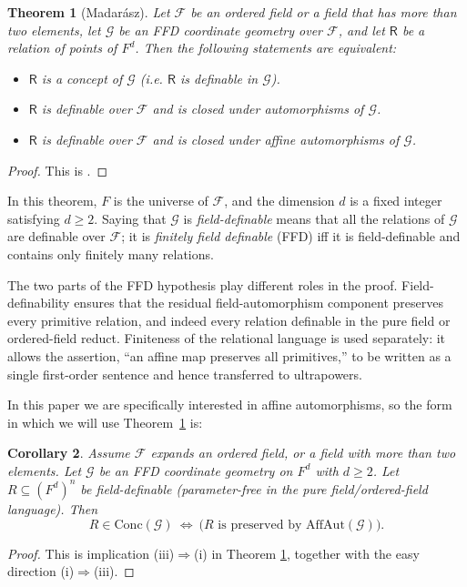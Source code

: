 \documentclass[11pt,a4paper]{article}
\newcommand{\G}{\mathcal{G}}
\newcommand{\F}{\mathcal{F}}
\newtheorem{theorem}{Theorem}[section]
\newtheorem{corollary}[theorem]{Corollary}
\theoremstyle{definition}
\begin{document}
\begin{theorem}[Madar\'asz]
	\label{thm:mss26}
	Let $\mathcal{F}$ be an ordered field or a field that has more than two elements, let $\mathcal{G}$
	be an FFD coordinate geometry over $\mathcal{F}$, and let $\mathsf{R}$ be a relation of points of $F^d$. Then the
	following statements are equivalent:
	\begin{itemize}
		\item[(i)] $\mathsf{R}$ is a concept of $\mathcal{G}$ (i.e. $\mathsf{R}$ is definable in $\mathcal{G}$).
		\item[(ii)] $\mathsf{R}$ is definable over $\mathcal{F}$ and is closed under automorphisms of $\mathcal{G}$.
		\item[(iii)] $\mathsf{R}$ is definable over $\mathcal{F}$ and is closed under affine automorphisms of $\mathcal{G}$.
	\end{itemize}
\end{theorem}
\begin{proof}This is \cite[Theorem~4.2]{MSS26}.\end{proof}
In this theorem, $F$ is the universe of $\mathcal{F}$, and the dimension $d$ is a fixed integer satisfying $d \ge 2$. Saying that $\mathcal{G}$ is \emph{field-definable} means that all the relations of $\mathcal{G}$ are definable over $\mathcal{F}$; it is \emph{finitely field definable } (FFD) iff it is field-definable and contains only finitely many relations.


The two parts of the FFD hypothesis play different roles in the proof.
Field-definability ensures that the residual field-automorphism
component preserves every primitive relation, and indeed every relation
definable in the pure field or ordered-field reduct. Finiteness of the
relational language is used separately: it allows the assertion, ``an
affine map preserves all primitives,'' to be written as a single
first-order sentence and hence transferred to ultrapowers.

In this paper we are specifically interested in affine automorphisms, so the form in which
we will use Theorem~\ref{thm:mss26} is:

\begin{corollary}
\label{thm:4.1}
Assume $\F$ expands an ordered field, or a field
with more than two elements. Let $\G$ be an FFD coordinate geometry on $F^d$ with
$d\ge 2$. Let $R\subseteq (F^d)^n$ be field-definable
(parameter-free in the pure field/ordered-field language). Then \[
R\in \mathrm{Conc}(\G)\ \Longleftrightarrow\ \big(\text{$R$ is preserved by }\mathrm{AffAut}(\G)\Big).
\]
\end{corollary}
\begin{proof}
	This is implication (iii)$\Rightarrow$(i) in Theorem
\ref{thm:mss26}, together with the easy direction
(i)$\Rightarrow$(iii).
\end{proof}
\end{document}
